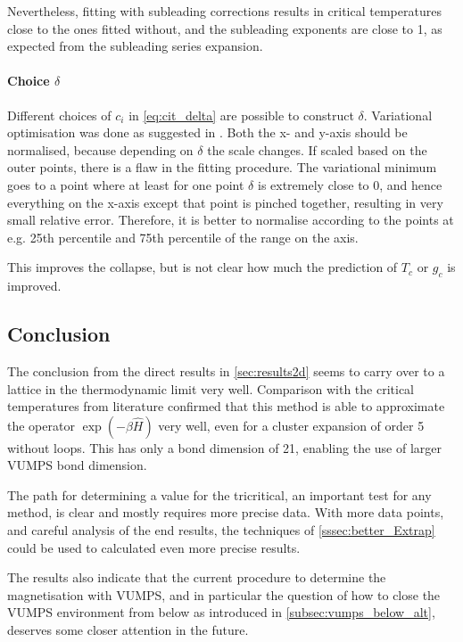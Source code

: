Nevertheless, fitting with subleading corrections results in critical temperatures close to the ones fitted without, and the subleading exponents are close to 1, as expected from the subleading series expansion.

\paragraph{ Choice  $\delta$  }

Different choices of $c_i$ in \cref{eq:cit_delta} are possible to construct $\delta$.  Variational optimisation was done as suggested in \cite{Nietner2020}. Both the x- and y-axis should be normalised, because depending on $\delta$ the scale changes. If scaled based on the outer points, there is a flaw in the fitting procedure.  The variational minimum goes to a point where at least for one point $\delta$ is extremely close to 0, and hence everything on the x-axis except that point is pinched together, resulting in very small relative error. Therefore, it is better to normalise according to the points at e.g. 25th percentile and 75th percentile of the range on the  axis.

This improves the collapse, but is not clear how much the prediction of $T_c$ or $g_c$ is improved.

\subsection{Conclusion}

The conclusion from the direct results in \cref{sec:results2d} seems to carry over to a lattice in the thermodynamic limit very well. Comparison with the critical temperatures from literature confirmed that this method is able to approximate the operator $\exp(-\beta \hat{H})$ very well, even for a cluster expansion of order 5 without loops. This has only a bond dimension of 21, enabling the use of larger VUMPS bond dimension.

The path for determining a value for the tricritical, an important test for any method, is clear and mostly requires more precise data. With more data points, and careful analysis of the end results, the techniques of \cref{sssec:better_Extrap} could be used to calculated even more precise results.

The results also indicate that the current procedure to determine the magnetisation with VUMPS, and in particular the question of how to close the VUMPS environment from below as introduced in \cref{subsec:vumps_below_alt}, deserves some closer attention in the future.